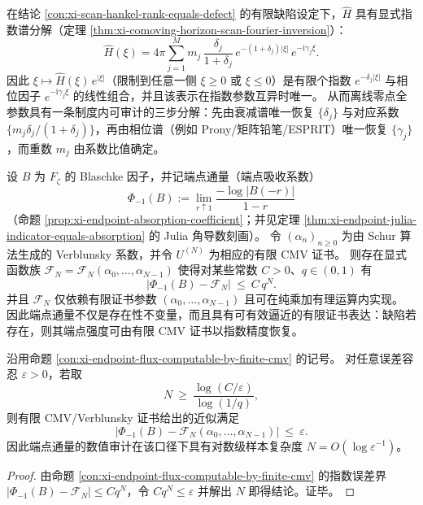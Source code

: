 \begin{proposition}\label{con:xi-scan-exponential-spectrum-separation}
在结论 \ref{con:xi-scan-hankel-rank-equals-defect} 的有限缺陷设定下，\(\widehat H\) 具有显式指数谱分解（定理 \ref{thm:xi-comoving-horizon-scan-fourier-inversion}）：
\[
\widehat H(\xi)
=4\pi\sum_{j=1}^{M} m_j\,\frac{\delta_j}{1+\delta_j}\,
e^{-(1+\delta_j)|\xi|}\,e^{-\mathrm{i}\gamma_j\xi}.
\]
因此 \( \xi\mapsto \widehat H(\xi)\,e^{|\xi|}\)（限制到任意一侧 \(\xi\ge 0\) 或 \(\xi\le 0\)）是有限个指数 \(e^{-\delta_j|\xi|}\) 与相位因子 \(e^{-\mathrm{i}\gamma_j\xi}\) 的线性组合，并且该表示在指数参数互异时唯一。
从而离线零点全参数具有一条制度内可审计的三步分解：先由衰减谱唯一恢复 \(\{\delta_j\}\) 与对应系数 \(\{m_j\delta_j/(1+\delta_j)\}\)，再由相位谱（例如 Prony/矩阵铅笔/ESPRIT）唯一恢复 \(\{\gamma_j\}\)，而重数 \(m_j\) 由系数比值确定。
\end{proposition}

\begin{proposition}\label{con:xi-endpoint-flux-computable-by-finite-cmv}
设 \(B\) 为 \(F_{\zeta}\) 的 Blaschke 因子，并记端点通量（端点吸收系数）
\[
\Phi_{-1}(B):=\lim_{r\uparrow 1}\frac{-\log|B(-r)|}{1-r}
\]
（命题 \ref{prop:xi-endpoint-absorption-coefficient}；并见定理 \ref{thm:xi-endpoint-julia-indicator-equals-absorption} 的 Julia 角导数刻画）。
令 \((\alpha_n)_{n\ge 0}\) 为由 Schur 算法生成的 Verblunsky 系数，并令 \(U^{(N)}\) 为相应的有限 CMV 证书。
则存在显式函数族 \(\mathcal{F}_N=\mathcal{F}_N(\alpha_0,\dots,\alpha_{N-1})\) 使得对某些常数 \(C>0\)、\(q\in(0,1)\) 有
\[
\bigl|\Phi_{-1}(B)-\mathcal{F}_N\bigr|\ \le\ C\,q^N.
\]
并且 \(\mathcal{F}_N\) 仅依赖有限证书参数 \((\alpha_0,\dots,\alpha_{N-1})\) 且可在纯乘加有理运算内实现。
因此端点通量不仅是存在性不变量，而且具有可有效逼近的有限证书表达：缺陷若存在，则其端点强度可由有限 CMV 证书以指数精度恢复。
\end{proposition}

\begin{corollary}\label{cor:xi-endpoint-flux-log-sample-complexity}
沿用命题 \ref{con:xi-endpoint-flux-computable-by-finite-cmv} 的记号。
对任意误差容忍 \(\varepsilon>0\)，若取
\[
N\ \ge\ \frac{\log(C/\varepsilon)}{\log(1/q)},
\]
则有限 CMV/Verblunsky 证书给出的近似满足
\[
\bigl|\Phi_{-1}(B)-\mathcal{F}_N(\alpha_0,\dots,\alpha_{N-1})\bigr|\ \le\ \varepsilon.
\]
因此端点通量的数值审计在该口径下具有对数级样本复杂度 \(N=O(\log \varepsilon^{-1})\)。
\end{corollary}
\begin{proof}
由命题 \ref{con:xi-endpoint-flux-computable-by-finite-cmv} 的指数误差界 \( |\Phi_{-1}(B)-\mathcal{F}_N|\le Cq^N \)，令 \(Cq^N\le\varepsilon\) 并解出 \(N\) 即得结论。证毕。
\end{proof}

